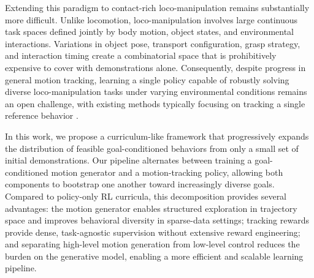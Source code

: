 \documentclass{article}
\begin{document}
Extending this paradigm to contact-rich loco-manipulation remains substantially more difficult. Unlike locomotion, loco-manipulation involves large continuous task spaces defined jointly by body motion, object states, and environmental interactions. Variations in object pose, transport configuration, grasp strategy, and interaction timing create a combinatorial space that is prohibitively expensive to cover with demonstrations alone. Consequently, despite progress in general motion tracking, learning a single policy capable of robustly solving diverse loco-manipulation tasks under varying environmental conditions remains an open challenge, with existing methods typically focusing on tracking a single reference behavior \cite{yang2025omniretarget, dhedin2026dynaretargetdynamicallyfeasibleretargetingusing}.

In this work, we propose a curriculum-like framework that progressively expands the distribution of feasible goal-conditioned behaviors from only a small set of initial demonstrations. Our pipeline alternates between training a goal-conditioned motion generator and a motion-tracking policy, allowing both components to bootstrap one another toward increasingly diverse goals. Compared to policy-only RL curricula, this decomposition provides several advantages: the motion generator enables structured exploration in trajectory space and improves behavioral diversity in sparse-data settings; tracking rewards provide dense, task-agnostic supervision without extensive reward engineering; and separating high-level motion generation from low-level control reduces the burden on the generative model, enabling a more efficient and scalable learning pipeline.
\end{document}
